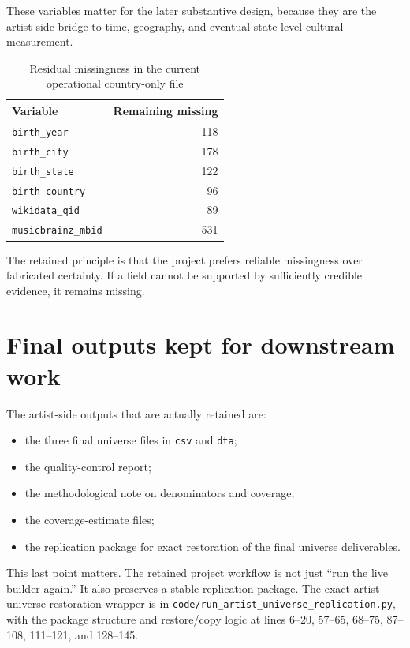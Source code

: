 \documentclass[11pt]{article}
\begin{document}
These variables matter for the later substantive design, because they are the
artist-side bridge to time, geography, and eventual state-level cultural
measurement.

\begin{table}[H]
\centering
\caption{Residual missingness in the current operational country-only file}
\begin{tabularx}{\textwidth}{Y r}
\toprule
Variable & Remaining missing \\
\midrule
\texttt{birth\_year} & 118 \\
\texttt{birth\_city} & 178 \\
\texttt{birth\_state} & 122 \\
\texttt{birth\_country} & 96 \\
\texttt{wikidata\_qid} & 89 \\
\texttt{musicbrainz\_mbid} & 531 \\
\bottomrule
\end{tabularx}
\end{table}

The retained principle is that the project prefers reliable missingness over
fabricated certainty. If a field cannot be supported by sufficiently credible
evidence, it remains missing.

\section{Final outputs kept for downstream work}
The artist-side outputs that are actually retained are:
\begin{itemize}[leftmargin=2em]
\item the three final universe files in \texttt{csv} and \texttt{dta};
\item the quality-control report;
\item the methodological note on denominators and coverage;
\item the coverage-estimate files;
\item the replication package for exact restoration of the final universe
deliverables.
\end{itemize}

This last point matters. The retained project workflow is not just ``run the
live builder again.'' It also preserves a stable replication package. The exact
artist-universe restoration wrapper is in
\texttt{code/run\_artist\_universe\_replication.py}, with the package structure
and restore/copy logic at lines 6--20, 57--65, 68--75, 87--108, 111--121, and
128--145.
\end{document}
